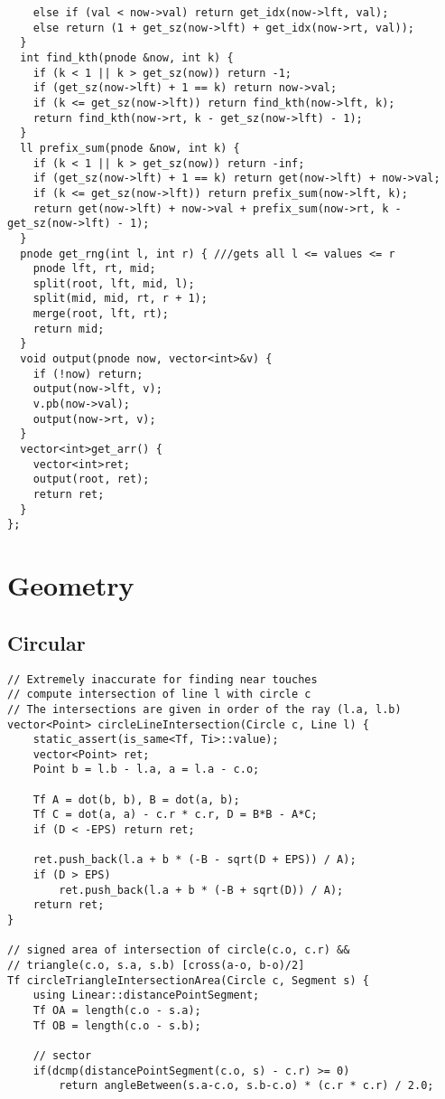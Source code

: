 \documentclass[FSZ,a4paper,onesided]{article}
\begin{document}
\begin{multicols*}{\COLS}
\begin{lstlisting}
    else if (val < now->val) return get_idx(now->lft, val);
    else return (1 + get_sz(now->lft) + get_idx(now->rt, val));
  }
  int find_kth(pnode &now, int k) {
    if (k < 1 || k > get_sz(now)) return -1;
    if (get_sz(now->lft) + 1 == k) return now->val;
    if (k <= get_sz(now->lft)) return find_kth(now->lft, k);
    return find_kth(now->rt, k - get_sz(now->lft) - 1);
  }
  ll prefix_sum(pnode &now, int k) {
    if (k < 1 || k > get_sz(now)) return -inf;
    if (get_sz(now->lft) + 1 == k) return get(now->lft) + now->val;
    if (k <= get_sz(now->lft)) return prefix_sum(now->lft, k);
    return get(now->lft) + now->val + prefix_sum(now->rt, k - get_sz(now->lft) - 1);
  }
  pnode get_rng(int l, int r) { ///gets all l <= values <= r
    pnode lft, rt, mid;
    split(root, lft, mid, l);
    split(mid, mid, rt, r + 1);
    merge(root, lft, rt);
    return mid;
  }
  void output(pnode now, vector<int>&v) {
    if (!now) return;
    output(now->lft, v);
    v.pb(now->val);
    output(now->rt, v);
  }
  vector<int>get_arr() {
    vector<int>ret;
    output(root, ret);
    return ret;
  }
};
\end{lstlisting}
\section{Geometry}
\subsection{Circular}
\begin{lstlisting}
// Extremely inaccurate for finding near touches
// compute intersection of line l with circle c
// The intersections are given in order of the ray (l.a, l.b)
vector<Point> circleLineIntersection(Circle c, Line l) {
    static_assert(is_same<Tf, Ti>::value);
    vector<Point> ret;
    Point b = l.b - l.a, a = l.a - c.o;

    Tf A = dot(b, b), B = dot(a, b);
    Tf C = dot(a, a) - c.r * c.r, D = B*B - A*C;
    if (D < -EPS) return ret;

    ret.push_back(l.a + b * (-B - sqrt(D + EPS)) / A);
    if (D > EPS)
        ret.push_back(l.a + b * (-B + sqrt(D)) / A);
    return ret;
}

// signed area of intersection of circle(c.o, c.r) &&
// triangle(c.o, s.a, s.b) [cross(a-o, b-o)/2]
Tf circleTriangleIntersectionArea(Circle c, Segment s) {
    using Linear::distancePointSegment;
    Tf OA = length(c.o - s.a);
    Tf OB = length(c.o - s.b);

    // sector
    if(dcmp(distancePointSegment(c.o, s) - c.r) >= 0)
        return angleBetween(s.a-c.o, s.b-c.o) * (c.r * c.r) / 2.0;


\end{lstlisting}
\end{multicols*}
\end{document}
